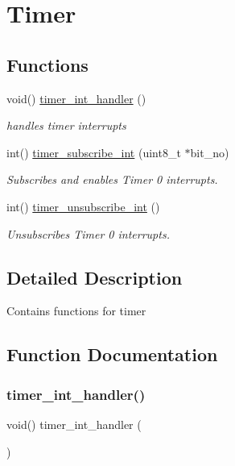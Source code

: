 \hypertarget{group__Timer}{}\section{Timer}
\label{group__Timer}
\subsection*{Functions}
\begin{DoxyCompactItemize}
\item 
void() \hyperlink{group__Timer_ga91a2072306c68353712a6b771287dc2c}{timer\+\_\+int\+\_\+handler} ()
\begin{DoxyCompactList}\small\item\em handles timer interrupts \end{DoxyCompactList}\item 
int() \hyperlink{group__Timer_gac57a7e1140a7e00ad95ac5488d2a671b}{timer\+\_\+subscribe\+\_\+int} (uint8\+\_\+t $\ast$bit\+\_\+no)
\begin{DoxyCompactList}\small\item\em Subscribes and enables Timer 0 interrupts. \end{DoxyCompactList}\item 
int() \hyperlink{group__Timer_gafabd21de449be154dd65d5fdb2d8045d}{timer\+\_\+unsubscribe\+\_\+int} ()
\begin{DoxyCompactList}\small\item\em Unsubscribes Timer 0 interrupts. \end{DoxyCompactList}\end{DoxyCompactItemize}


\subsection{Detailed Description}
Contains functions for timer 

\subsection{Function Documentation}
\mbox{\label{group__Timer_ga91a2072306c68353712a6b771287dc2c}} 
\subsubsection{\texorpdfstring{timer\+\_\+int\+\_\+handler()}{timer\_int\_handler()}}
{\footnotesize\ttfamily void() timer\+\_\+int\+\_\+handler (\begin{DoxyParamCaption}{ }\end{DoxyParamCaption})}



